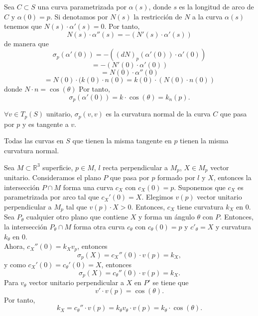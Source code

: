 \begin{note}
  Sea $C \subset S$ una curva parametrizada por $\alpha(s)$, donde $s$ es la longitud de arco de $C$ y $\alpha(0) = p$. Si denotamos por $N(s)$ la restricción de $N$ a la curva $\alpha(s)$ tenemos que $N(s) \cdot \alpha'(s) = 0$. Por tanto,
  \[ 
    N(s) \cdot \alpha''(s) = - (N'(s) \cdot \alpha'(s)) 
  \]
  de manera que
  \[ 
    \sigma_{p}(\alpha'(0)) = - ((d N)_{p}(\alpha'(0)) \cdot \alpha'(0)) 
  \] 
  \[ 
    = - (N'(0) \cdot \alpha'(0)) 
  \] 
  \[ 
    = N(0) \cdot \alpha''(0) 
  \] 
  \[ 
    = N(0) \cdot (k(0) \cdot n(0) = k(0) \cdot (N(0) \cdot n(0)) 
  \] 
  donde $N \cdot n = \cos(\theta)$
  Por tanto,
  \[
    \sigma_{p}(\alpha'(0)) = k \cdot \cos(\theta) = k_{n}(p).
  \]
\end{note}

\begin{obs}
  $\forall v \in T_{p}(S)$ unitario, $\sigma_{p}(v, v)$ es la curvatura normal de la curva $C$ que pasa por $p$ y es tangente a $v$.
\end{obs}

\begin{prop}
  Todas las curvas en $S$ que tienen la misma tangente en $p$ tienen la misma curvatura normal.
\end{prop}

\begin{dem}
  Sea $M \subset \mathbb{R}^{3}$ superficie, $p \in M$, $l$ recta perpendicular a $M_{p}$, $X \in M_{p}$ vector unitario. Consideramos el plano $P$ que pasa por $p$ formado por $l$ y $X$, entonces la intersección $P \cap M$ forma una curva $c_{X}$ con $c_{X}(0) = p$. Suponemos que $c_{X}$ es parametrizada por arco tal que $c_{X}'(0) = X$. Elegimos $v(p)$ vector unitario perpendicular a $M_{p}$ tal que $v(p) \cdot X > 0$. Entonces, $c_{X}$ tiene curvatura $k_{X}$ en $0$. Sea $P_{\theta}$ cualquier otro plano que contiene $X$ y forma un ángulo $\theta$ con $P$. Entonces, la intersección $P_{\theta} \cap M$ forma otra curva $c_{\theta}$ con $c_{\theta}(0) = p$ y $c'_{\theta} = X$ y curvatura $k_{\theta}$ en $0$. \\

  Ahora, $c_{X}''(0) = k_{X} v_{p}$, entonces
  \[ 
    \sigma_{p}(X) = c_{X}''(0) \cdot v(p)= k_{X},
  \]
  y como $c_{X}'(0) = c_{\theta}'(0) = X$, entonces
  \[ 
    \sigma_{p}(X) = c_{\theta}''(0) \cdot v(p)= k_{X}.
  \] 
  Para $v_{\theta}$ vector unitario perpendicular a $X$ en $P'$ se tiene que
  \[
    v' \cdot v(p) = \cos(\theta).
  \]
  Por tanto, 
  \[ 
    k_{X} = c_{\theta}'' \cdot v(p) = k_{\theta} v_{\theta} \cdot v(p) = k_{\theta}  \cdot \cos(\theta).
  \] 
\end{dem}

